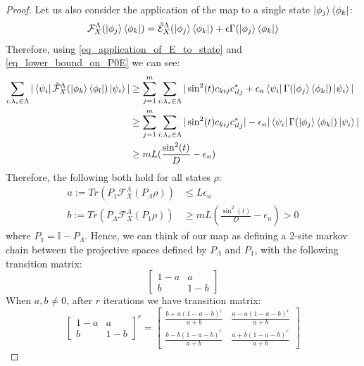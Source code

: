 \documentclass[10pt]{amsart}
\begin{document}
\begin{proof}
Let us also consider the application of the map to a single state $\ket{\phi_j}\bra{\phi_k}$:
\begin{equation}
    \mathcal{F}^{\Lambda}_X(\ket{\phi_j}\bra{\phi_k}) = \tilde{\mathcal{E}}^{\Lambda}_X(\ket{\phi_j}\bra{\phi_k}) + \epsilon\Gamma(\ket{\phi_j}\bra{\phi_k})
\end{equation}
Therefore, using \eqref{eq_application_of_E_to_state} and \eqref{eq_lower_bound_on_P0E} we can see:
\begin{align}
    \sum_{i: \lambda_i \in \Lambda} |\bra{\psi_i} \tilde{\mathcal{F}}^{\Lambda}_{X}(\ket{\phi_k}\bra{\phi_l}) \ket{\psi_i}| &\geq \sum_{j=1}^m\sum_{i: \lambda_s \in \Lambda}|\sin^2(t) c_{kij}c^*_{ilj} + \epsilon_n\bra{\psi_i} \Gamma(\ket{\phi_j}\bra{\phi_k}) \ket{\psi_i}|\\
    &\geq \sum_{j=1}^m\sum_{i: \lambda_s \in \Lambda}|\sin^2(t) c_{kij}c^*_{ilj}| - \epsilon_n|\bra{\psi_i} \Gamma(\ket{\phi_j}\bra{\phi_k}) \ket{\psi_i}|\\
    &\geq mL (\frac{\sin^2(t)}{D} - \epsilon_n)
\end{align}
Therefore, the following both hold for all states $\rho$:
\begin{align}
    a:=Tr(P_1\mathcal{F}^{\Lambda}_X(P_{\Lambda} \rho)) &\leq L\epsilon_n\\
    b:=Tr(P_{\Lambda}\mathcal{F}^{\Lambda}_X(P_1 \rho)) &\geq mL \left(\frac{\sin^2(t)}{D} - \epsilon_n\right) > 0
\end{align}
where $P_1 = \mathbb{I} - P_{\Lambda}$. Hence, we can think of our map as defining a 2-site markov chain between the projective spaces defined by $P_{\Lambda}$ and $P_1$, with the following transition matrix:
\begin{equation}
    \begin{bmatrix}
        1-a & a\\
        b & 1-b
    \end{bmatrix}
\end{equation}
When $a,b \neq 0$, after $r$ iterations we have transition matrix:
\begin{equation}
    \begin{bmatrix}
        1-a & a\\
        b & 1-b
    \end{bmatrix}^r = \begin{bmatrix}
        \frac{b + a(1-a-b)^r}{a+b} & \frac{a- a(1-a-b)^r}{a+b}\\
        \frac{b -b(1-a-b)^r}{a+b} & \frac{a+ b(1-a-b)^r}{a+b}
    \end{bmatrix}

\end{equation}
\end{proof}
\end{document}

